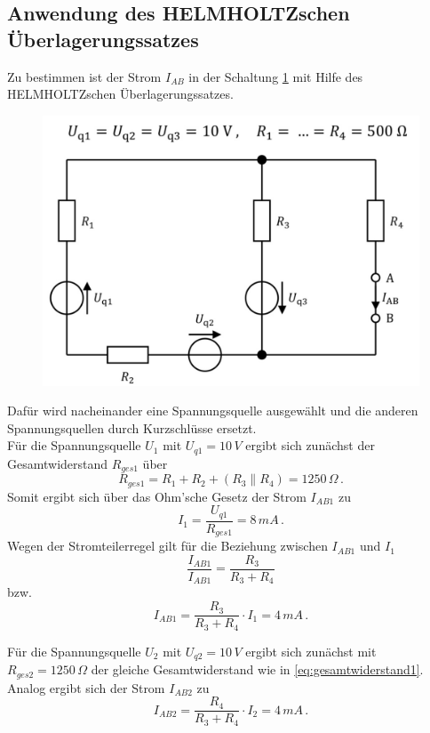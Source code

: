 \subsection{Anwendung des HELMHOLTZschen Überlagerungssatzes}\label{sec:helmholtz}

Zu bestimmen ist der Strom $I_{AB}$ in der Schaltung \ref{fig:helmholtz} mit Hilfe des HELMHOLTZschen Überlagerungssatzes.

\begin{figure}[ht]
    \centering
    \includegraphics[width=0.5\linewidth]{Bilder/Helmholtz.png}
    \label{fig:helmholtz}
\end{figure}

Dafür wird nacheinander eine Spannungsquelle ausgewählt und die anderen Spannungsquellen durch Kurzschlüsse ersetzt.\\
Für die Spannungsquelle $U_1$ mit $U_{q1}=10\,V$ ergibt sich zunächst der Gesamtwiderstand $R_{ges1}$ über
\begin{equation}
    \label{eq:gesamtwiderstand1}
    R_{ges1}=R_1+R_2+(R_3\parallel R_4)=1250\,\Omega\, .
\end{equation}
Somit ergibt sich über das Ohm'sche Gesetz der Strom $I_{AB1}$ zu
\begin{equation*}
    I_{1}=\frac{U_{q1}}{R_{ges1}}=8\,mA\, .
\end{equation*}
Wegen der Stromteilerregel gilt für die Beziehung zwischen $I_{AB1}$ und $I_{1}$
\begin{equation*}
    \frac{I_{AB1}}{I_{AB1}}=\frac{R_3}{R_3+R_4}
\end{equation*}
bzw.
\begin{equation}
    \label{eq:stromab1}
    I_{AB1}=\frac{R_3}{R_3+R_4}\cdot{I_{1}}=4\,mA\, .
\end{equation}

Für die Spannungsquelle $U_2$ mit $U_{q2}=10\,V$ ergibt sich zunächst mit $R_{ges2} = 1250\,\Omega$ der gleiche Gesamtwiderstand wie in \eqref{eq:gesamtwiderstand1}. Analog ergibt sich der Strom $I_{AB2}$ zu
\begin{equation}
    \label{eq:stromab2}
    I_{AB2}=\frac{R_4}{R_3+R_4}\cdot{I_{2}}=4\,mA\, .
\end{equation}

